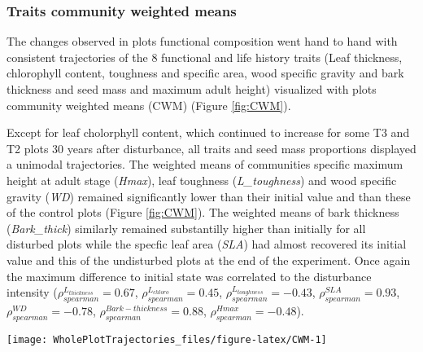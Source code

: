 \documentclass[fleqn,10pt]{ArtEcoFoG} %
\theoremstyle{definition}
\theoremstyle{definition}
\theoremstyle{definition}
\theoremstyle{remark}
\begin{document}
\subsubsection{Traits community weighted
means}\label{traits-community-weighted-means}

The changes observed in plots functional composition went hand to hand
with consistent trajectories of the 8 functional and life history traits
(Leaf thickness, chlorophyll content, toughness and specific area, wood
specific gravity and bark thickness and seed mass and maximum adult
height) visualized with plots community weighted means (CWM) (Figure
\ref{fig:CWM}).

Except for leaf cholorphyll content, which continued to increase for
some T3 and T2 plots 30 years after disturbance, all traits and seed
mass proportions displayed a unimodal trajectories. The weighted means
of communities specific maximum height at adult stage (\emph{Hmax}),
leaf toughness (\emph{L\_toughness}) and wood specific gravity
(\emph{WD}) remained significantly lower than their initial value and
than these of the control plots (Figure \ref{fig:CWM}). The weighted
means of bark thickness (\emph{Bark\_thick}) similarly remained
substantilly higher than initially for all disturbed plots while the
specfic leaf area (\emph{SLA}) had almost recovered its initial value
and this of the undisturbed plots at the end of the experiment. Once
again the maximum difference to initial state was correlated to the
disturbance intensity (\(\rho_{spearman}^{L_{thickness}}=0.67\),
\(\rho_{spearman}^{L_{chloro}}=0.45\),
\(\rho_{spearman}^{L_{toughness}}=-0.43\),
\(\rho_{spearman}^{SLA}=0.93\), \(\rho_{spearman}^{WD}=-0.78\),
\(\rho_{spearman}^{Bark-thickness}=0.88\),
\(\rho_{spearman}^{Hmax}=-0.48\)).

\begin{figure*}

{\centering \texttt{[image: WholePlotTrajectories\_files/figure-latex/CWM-1]} 

}

\caption{Trajectories of the communities weighted means (CWM) over 30 years after disturbance of 4 leaf traits (Leaf thickness, \emph{L\_thickness}, chlorophyll content, \emph{L\_chloro}, toughness, \emph{L\_toughness} and specific area, \emph{SLA}), 2 stem traits (wood specific gravity, \emph{WD}, and bark thickness, \emph{Bark-thick}) and one life trait (Specific maximum height at adult stage, \emph{Hmax}). Trajectories correspond to the median (solid line) and 0.025 and 0.975 percentile (gray envelope) observed after 50 iteration of the taxonomic uncertainty propagation and the missing trait value filling processes. Initial treatments are represented by solid lines colors with green for control, blue for T1,orange for T2 and red for T3.}\label{fig:CWM}
\end{figure*}
\end{document}
